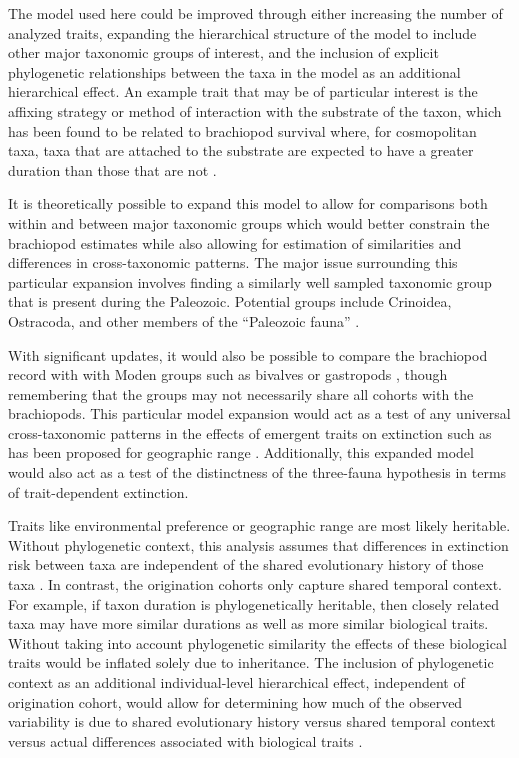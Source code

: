 \documentclass[11pt]{article}
\begin{document}
The model used here could be improved through either increasing the number of analyzed traits, expanding the hierarchical structure of the model to include other major taxonomic groups of interest, and the inclusion of explicit phylogenetic relationships between the taxa in the model as an additional hierarchical effect. An example trait that may be of particular interest is the affixing strategy or method of interaction with the substrate of the taxon, which has been found to be related to brachiopod survival where, for cosmopolitan taxa, taxa that are attached to the substrate are expected to have a greater duration than those that are not \citep{Alexander1977}.

It is theoretically possible to expand this model to allow for comparisons both within and between major taxonomic groups which would better constrain the brachiopod estimates while also allowing for estimation of similarities and differences in cross-taxonomic patterns. The major issue surrounding this particular expansion involves finding a similarly well sampled taxonomic group that is present during the Paleozoic. Potential groups include Crinoidea, Ostracoda, and other members of the ``Paleozoic fauna'' \citep{Sepkoski1981a}.

With significant updates, it would also be possible to compare the brachiopod record with with Moden groups such as bivalves or gastropods \citep{Sepkoski1981a}, though remembering that the groups may not necessarily share all cohorts with the brachiopods. This particular model expansion would act as a test of any universal cross-taxonomic patterns in the effects of emergent traits on extinction such as has been proposed for geographic range \citep{Payne2007}. Additionally, this expanded model would also act as a test of the distinctness of the \citet{Sepkoski1981a} three-fauna hypothesis in terms of trait-dependent extinction.

Traits like environmental preference or geographic range \citep{Jablonski1987,Hunt2005b} are most likely heritable. Without phylogenetic context, this analysis assumes that differences in extinction risk between taxa are independent of the shared evolutionary history of those  taxa \citep{Felsenstein1985b}. In contrast, the origination cohorts only capture shared temporal context. For example, if taxon duration is phylogenetically heritable, then closely related taxa may have more similar durations as well as more similar biological traits. Without taking into account phylogenetic similarity the effects of these biological traits would be inflated solely due to inheritance. The inclusion of phylogenetic context as an additional individual-level hierarchical effect, independent of origination cohort, would allow for determining how much of the observed variability is due to shared evolutionary history versus shared temporal context versus actual differences associated with biological traits \citep{Smits2015}.
\end{document}
